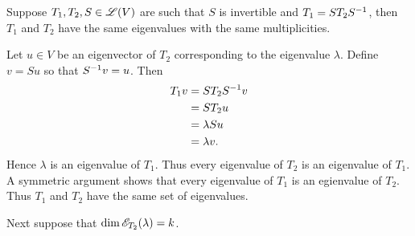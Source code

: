 \begin{exercise}
Suppose $T_1, T_2, S \in \mathscr{L}(V)$ are such that $S$ is invertible and
$T_1 = S T_2 S^{-1}$, then $T_1$ and $T_2$ have the same eigenvalues with the
same multiplicities.
\end{exercise}
\begin{solution}
Let $u \in V$ be an eigenvector of $T_2$ corresponding to the eigenvalue $\lambda$.
Define $v = S u$ so that $S^{-1} v = u$. Then
\begin{align*}
    T_1 v & = S T_2 S^{-1} v \\
          & = S T_2 u \\
          & = \lambda S u \\
          & = \lambda v.
\end{align*}
Hence $\lambda$ is an eigenvalue of $T_1$. Thus every eigenvalue of $T_2$ is an
eigenvalue of $T_1$. A symmetric argument shows that every eigenvalue of $T_1$
is an egienvalue of $T_2$. Thus $T_1$ and $T_2$ have the same set of eigenvalues.

Next suppose that $\dim \mathscr{E}_{T_2}(\lambda) = k$.
\end{solution}
